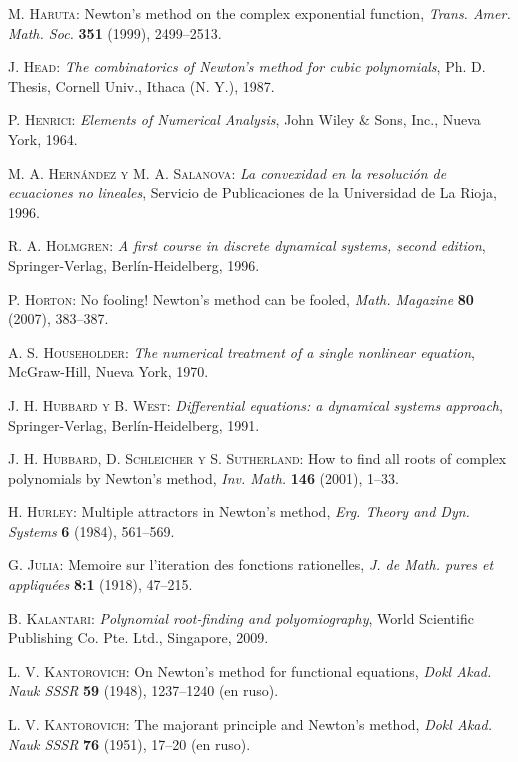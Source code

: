 \begin{thebibliography}{999}
\textsc{M. Haruta}:
{Newton's method on the complex exponential function},
\textit{Trans. Amer. Math. Soc.} \textbf{351} (1999), 2499--2513.

 \textsc{J. Head}:
\textit{The combinatorics of Newton's method for cubic polynomials}, Ph. D. Thesis, Cornell Univ., Ithaca (N. Y.), 1987.

\textsc{P. Henrici}:
\textit{Elements of Numerical Analysis}, John Wiley \& Sons, Inc.,
Nueva York, 1964.

\textsc{M. A. Hernández y M. A. Salanova}:
\textit{La convexidad en la resolución de ecuaciones no lineales}, Servicio de Publicaciones de la Universidad de La Rioja, 1996.

\textsc{R. A. Holmgren}:
\textit{A first course in discrete dynamical systems, second edition}, Springer-Verlag,
Berlín-Heidelberg, 1996.

 \textsc{P. Horton}:
No fooling! Newton's method can be fooled,
\textit{Math. Magazine}  \textbf{80}
(2007), 383--387.

\textsc{A. S. Householder}:
\textit{The numerical treatment of a single nonlinear equation}, McGraw-Hill,  Nueva York, 1970.

 \textsc{J. H. Hubbard y B. West}:
 \textit{Differential equations: a dynamical systems approach},
Springer-Verlag, Berlín-Heidelberg, 1991.

 \textsc{J. H. Hubbard, D. Schleicher y S. Sutherland}:
How to find all roots of complex polynomials by Newton's method,
\textit{Inv. Math.}  \textbf{146}
(2001), 1--33.

 \textsc{H. Hurley}:
 {Multiple attractors in Newton's method},
\textit{Erg. Theory and Dyn. Systems}  \textbf{6}
(1984), 561--569.


\textsc{G. Julia}:
{Memoire sur l'iteration des fonctions rationelles},
\textit{J. de Math. pures et appliqu\'ees}  \textbf{8:1}
(1918), 47--215.

 \textsc{B. Kalantari}: \textit{Polynomial root-finding and polyomiography},
World Scientific Publishing Co. Pte. Ltd., Singapore, 2009.

\textsc{L. V. Kantorovich}:
On Newton's method for functional equations,
\textit{Dokl Akad. Nauk SSSR} \textbf{59} (1948), 1237--1240 (en ruso).

\textsc{L. V. Kantorovich}:
The majorant principle and Newton's method,
\textit{Dokl Akad. Nauk SSSR} \textbf{76} (1951), 17--20 (en ruso).


\end{thebibliography}
